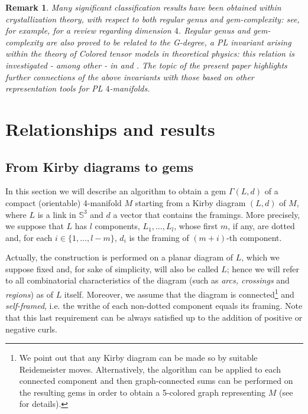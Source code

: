 \documentclass[12pt,a4paper]{article}
\newtheorem{remark}{Remark}
\newcommand{\G}{\Gamma}
\begin{document}
\medskip 

\begin{remark} \label{rem. invariants}  {\em Many significant classification results have been obtained within crystallization theory,  with respect to both regular genus and gem-complexity:  see, for example, \cite{Casali-Cristofori-Gagliardi Complutense 2015} for a review regarding  dimension $4$. Regular genus and gem-complexity are also proved to be related to the {\it G-degree}, a PL invariant arising within the theory of {\it Colored tensor models} in theoretical physics: this relation is investigated - among other - in \cite{Casali-Cristofori-Dartois-Grasselli} and \cite{Casali-Cristofori-Grasselli}.   
The topic of the present paper highlights further connections of the above invariants with those based on other representation tools for PL $4$-manifolds.   }
\end{remark}

\bigskip


\section{Relationships and results}

\medskip 

\subsection{From Kirby diagrams to gems}  \label{ss.from_Kirby_to_gems}
\smallskip

In this section we will describe an algorithm to obtain a gem $\G(L,d)$ of a compact (orientable) 4-manifold $M$ starting from a Kirby diagram $(L,d)$ of $M$, where $L$ is a link in $\mathbb S^3$ and $d$ a vector that contains the framings. More precisely, we suppose that $L$ has $l$ components, $L_1,\ldots,L_l$, whose first $m$, if any, are dotted and, for each $i\in\{1,\ldots,l-m\}$, $d_i$ is the framing of $(m+i)$-th component.

Actually, the construction is performed on a planar diagram of $L$, which we suppose fixed and, for sake of simplicity, will also be called $L$; hence we will refer to all combinatorial characteristics of the diagram (such as {\it arcs, crossings} and {\it regions}) 
as of $L$ itself.  
Moreover,  we assume that the diagram is connected\footnote{We point out that any Kirby diagram can be made so by suitable Reidemeister moves. Alternatively, the algorithm can be applied to each connected component and then graph-connected sums can be performed on the resulting gems in order to obtain a 5-colored graph representing $M$ (see \cite{Casali-Cristofori trisection bis} for details).} and {\it self-framed}, i.e. the writhe of each non-dotted component equals its framing. Note that this last requirement can be always satisfied up to the addition of positive or negative curls. 
\end{document}
